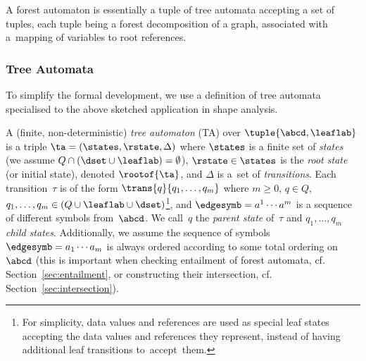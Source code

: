 A forest automaton is essentially a tuple of tree automata accepting a set of
tuples, each tuple being a forest decomposition of a graph, associated with a~mapping of variables to root references.

\subsubsection*{Tree Automata}
To simplify the formal development, we use a definition of tree automata specialised to the above sketched application in shape analysis.

A (finite, non-deterministic) \emph{tree automaton} (TA) over
$\tuple{\abcd,\leaflab}$
is a triple $\ta =
(\states, \rstate, \Delta)$ where $\states$ is a finite set of \emph{states}
(we assume $Q \cap (\dset \cup \leaflab) = \emptyset$),
$\rstate \in \states$ is the \emph{root state} (or initial state), denoted
$\rootof{\ta}$, and $\Delta$ is a~set of \emph{transitions}. Each
transition~$\tau$ is
of the form $\trans{q}{q_1, \dots, q_m}$ where $m \geq 0$, $q \in Q$,
$q_1,\ldots,q_m\in (Q \cup \leaflab \cup \dset)$\footnote{For
simplicity, data values and references are used as special leaf states accepting the
data values and references they represent, instead of having additional leaf
transitions to~accept~them.}, and $\edgesymb = a^1 \cdots a^m$ is a
sequence of different symbols from~$\abcd$.
We call~$q$ the \emph{parent state} of~$\tau$ and $q_1, \ldots, q_m$
\emph{child states}. 
%
Additionally, we assume the sequence of symbols  $\edgesymb = a_1 \cdots a_m$ is always ordered according to some total ordering on $\abcd$ (this is important when checking entailment of forest automata, cf. Section~\ref{sec:entailment}, or constructing their intersection, cf. Section~\ref{sec:intersection}).
%


